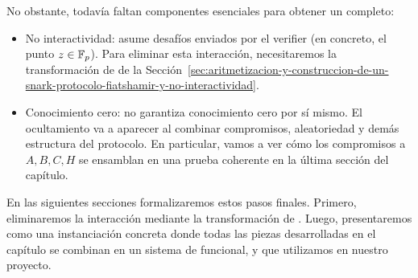 No obstante, todavía faltan componentes esenciales para obtener un \zkSNARK completo:
\begin{itemize}[itemsep=0.1 cm]
\item No interactividad: \KZG asume desafíos enviados por el verifier (en concreto, el punto $z \in \mathbb{F}_p$). Para eliminar esta interacción, necesitaremos la transformación de \FiatShamir de la Sección~\ref{sec:aritmetizacion-y-construccion-de-un-snark-protocolo-fiatshamir-y-no-interactividad}.
	\item Conocimiento cero: \KZG no garantiza conocimiento cero por sí mismo. El ocultamiento va a aparecer al combinar compromisos, aleatoriedad y demás estructura del protocolo. En particular, vamos a ver cómo los compromisos a $A, B, C, H$ se ensamblan en una prueba coherente en la última sección del capítulo.
\end{itemize}

En las siguientes secciones formalizaremos estos pasos finales. Primero, eliminaremos la interacción mediante la transformación de \FiatShamir \cite{Fiat}. Luego, presentaremos \Groth \cite{cryptoeprint:2016/260} como una instanciación concreta donde todas las piezas desarrolladas en el capítulo se combinan en un sistema de \zkSNARK funcional, y que utilizamos en nuestro proyecto.
